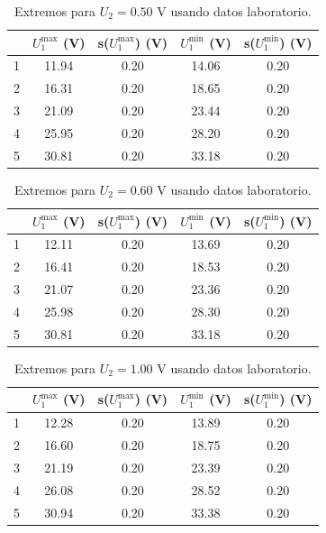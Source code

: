 \documentclass[12pt,a4paper]{article}
\numberwithin{equation}{section}
\numberwithin{figure}{section}
\begin{document}
 
\begin{table}[h!] 	 \centering 
\begin{tabular}{ccccc}
\hline & $U_1^{\max}$ (V) & s($U_1^{\max}$) (V) & $U_1^{\min}$ (V) & s($U_1^{\min}$) (V) \\
\hline
 1 & 11.94 & 0.20 & 14.06 & 0.20 \\
 2 & 16.31 & 0.20 & 18.65 & 0.20 \\
 3 & 21.09 & 0.20 & 23.44 & 0.20 \\
 4 & 25.95 & 0.20 & 28.20 & 0.20 \\
 5 & 30.81 & 0.20 & 33.18 & 0.20 \\
\hline
\end{tabular}\caption{Extremos para $U_2=0.50$ V usando datos laboratorio.} 
\label{Tab:lab-2} 
\end{table} 
 
 
\begin{table}[h!] 	 \centering 
\begin{tabular}{ccccc}
\hline & $U_1^{\max}$ (V) & s($U_1^{\max}$) (V) & $U_1^{\min}$ (V) & s($U_1^{\min}$) (V) \\
\hline
 1 & 12.11 & 0.20 & 13.69 & 0.20 \\
 2 & 16.41 & 0.20 & 18.53 & 0.20 \\
 3 & 21.07 & 0.20 & 23.36 & 0.20 \\
 4 & 25.98 & 0.20 & 28.30 & 0.20 \\
 5 & 30.81 & 0.20 & 33.18 & 0.20 \\
\hline
\end{tabular}\caption{Extremos para $U_2=0.60$ V usando datos laboratorio.} 
\label{Tab:lab-3} 
\end{table} 
 
 
\begin{table}[h!] 	 \centering 
\begin{tabular}{ccccc}
\hline & $U_1^{\max}$ (V) & s($U_1^{\max}$) (V) & $U_1^{\min}$ (V) & s($U_1^{\min}$) (V) \\
\hline
 1 & 12.28 & 0.20 & 13.89 & 0.20 \\
 2 & 16.60 & 0.20 & 18.75 & 0.20 \\
 3 & 21.19 & 0.20 & 23.39 & 0.20 \\
 4 & 26.08 & 0.20 & 28.52 & 0.20 \\
 5 & 30.94 & 0.20 & 33.38 & 0.20 \\
\hline
\end{tabular}\caption{Extremos para $U_2=1.00$ V usando datos laboratorio.} 
\label{Tab:lab-4} 
\end{table} 
 
\end{document}
